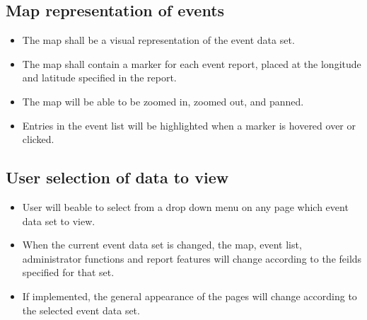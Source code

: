 \subsection{Map representation of events}
\begin{itemize}
\item The map shall be a visual representation of the event data set. 
\item The map shall contain a marker for each event report, placed at the longitude and latitude specified in the report.
\item The map will be able to be zoomed in, zoomed out, and panned.
\item Entries in the event list will be highlighted when a marker is hovered over or clicked.
\end{itemize}

\subsection{User selection of data to view}
\begin{itemize}
\item User will beable to select from a drop down menu on any page which event data set to view. 
\item When the current event data set is changed, the map, event list, administrator functions and report features will change according to the feilds specified for that set.
\item If implemented, the general appearance of the pages will change according to the selected event data set.
\end{itemize}

